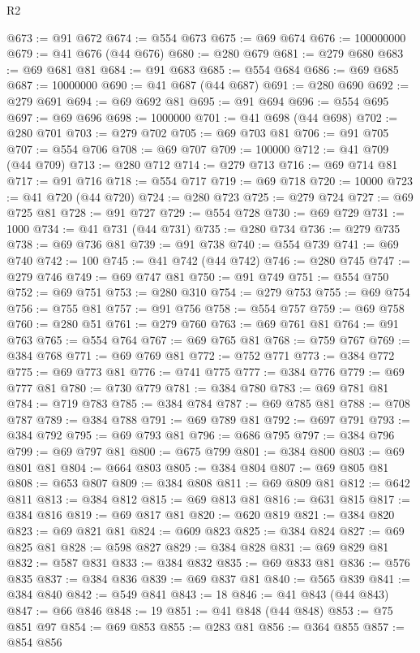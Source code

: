 \begin{lexlean}{R2}
\begin{coremodule}
@673 := @91 @672
@674 := @554 @673
@675 := @69 @674
@676 := 100000000
@679 := @41 @676 (@44 @676)
@680 := @280 @679
@681 := @279 @680
@683 := @69 @681 @81
@684 := @91 @683
@685 := @554 @684
@686 := @69 @685
@687 := 10000000
@690 := @41 @687 (@44 @687)
@691 := @280 @690
@692 := @279 @691
@694 := @69 @692 @81
@695 := @91 @694
@696 := @554 @695
@697 := @69 @696
@698 := 1000000
@701 := @41 @698 (@44 @698)
@702 := @280 @701
@703 := @279 @702
@705 := @69 @703 @81
@706 := @91 @705
@707 := @554 @706
@708 := @69 @707
@709 := 100000
@712 := @41 @709 (@44 @709)
@713 := @280 @712
@714 := @279 @713
@716 := @69 @714 @81
@717 := @91 @716
@718 := @554 @717
@719 := @69 @718
@720 := 10000
@723 := @41 @720 (@44 @720)
@724 := @280 @723
@725 := @279 @724
@727 := @69 @725 @81
@728 := @91 @727
@729 := @554 @728
@730 := @69 @729
@731 := 1000
@734 := @41 @731 (@44 @731)
@735 := @280 @734
@736 := @279 @735
@738 := @69 @736 @81
@739 := @91 @738
@740 := @554 @739
@741 := @69 @740
@742 := 100
@745 := @41 @742 (@44 @742)
@746 := @280 @745
@747 := @279 @746
@749 := @69 @747 @81
@750 := @91 @749
@751 := @554 @750
@752 := @69 @751
@753 := @280 @310
@754 := @279 @753
@755 := @69 @754
@756 := @755 @81
@757 := @91 @756
@758 := @554 @757
@759 := @69 @758
@760 := @280 @51
@761 := @279 @760
@763 := @69 @761 @81
@764 := @91 @763
@765 := @554 @764
@767 := @69 @765 @81
@768 := @759 @767
@769 := @384 @768
@771 := @69 @769 @81
@772 := @752 @771
@773 := @384 @772
@775 := @69 @773 @81
@776 := @741 @775
@777 := @384 @776
@779 := @69 @777 @81
@780 := @730 @779
@781 := @384 @780
@783 := @69 @781 @81
@784 := @719 @783
@785 := @384 @784
@787 := @69 @785 @81
@788 := @708 @787
@789 := @384 @788
@791 := @69 @789 @81
@792 := @697 @791
@793 := @384 @792
@795 := @69 @793 @81
@796 := @686 @795
@797 := @384 @796
@799 := @69 @797 @81
@800 := @675 @799
@801 := @384 @800
@803 := @69 @801 @81
@804 := @664 @803
@805 := @384 @804
@807 := @69 @805 @81
@808 := @653 @807
@809 := @384 @808
@811 := @69 @809 @81
@812 := @642 @811
@813 := @384 @812
@815 := @69 @813 @81
@816 := @631 @815
@817 := @384 @816
@819 := @69 @817 @81
@820 := @620 @819
@821 := @384 @820
@823 := @69 @821 @81
@824 := @609 @823
@825 := @384 @824
@827 := @69 @825 @81
@828 := @598 @827
@829 := @384 @828
@831 := @69 @829 @81
@832 := @587 @831
@833 := @384 @832
@835 := @69 @833 @81
@836 := @576 @835
@837 := @384 @836
@839 := @69 @837 @81
@840 := @565 @839
@841 := @384 @840
@842 := @549 @841
@843 := 18
@846 := @41 @843 (@44 @843)
@847 := @66 @846
@848 := 19
@851 := @41 @848 (@44 @848)
@853 := @75 @851 @97
@854 := @69 @853
@855 := @283 @81
@856 := @364 @855
@857 := @854 @856

\end{coremodule}
\end{lexlean}
